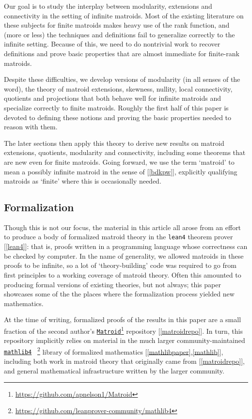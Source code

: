 \documentclass{amsart}
\theoremstyle{plain}
\theoremstyle{definition}
\newcommand{\smalltt}[1]{{\small\texttt{#1}}}
\begin{document}
Our goal is to study the interplay between modularity, 
extensions and connectivity in the setting of infinite matroids. 
Most of the existing literature on these subjects for finite matroids 
makes heavy use of the rank function, 
and (more or less) the techniques and definitions fail to generalize correctly to the infinite setting. 
Because of this,  
we need to do nontrivial work to recover definitions and prove basic 
properties that are almost immediate for finite-rank matroids. 

Despite these difficulties, we develop versions of modularity (in all senses of the word), 
the theory of matroid extensions, skewness, nullity, local connectivity,
quotients and projections 
that both behave well for infinite matroids and specialize correctly to finite matroids. 
Roughly the first half of this paper is devoted to defining these notions
and proving the basic properties needed to reason with them.

The later sections then apply this theory to derive new results on matroid extensions, 
quotients, modularity and connectivity, including some theorems 
that are new even for finite matroids. 
Going forward, we use the term `matroid' to mean a possibly infinite matroid 
in the sense of [\ref{bdkpw}], explicitly qualifying matroids as `finite' where 
this is occasionally needed. 

\subsection*{Formalization}

Though this is not our focus, 
the material in this article all arose from an effort to produce 
a body of formalized matroid theory in the \smalltt{lean4} theorem prover [\ref{lean4}]: 
that is, proofs written in a programming language whose correctness can be checked 
by computer.
In the name of generality, we allowed matroids in these proofs to be infinite,
so a lot of `theory-building' code was required to go from first principles
to a working coverage of matroid theory.  
Often this amounted to producing formal versions of existing theories, 
but not always; this paper showcases some of the the places where the formalization
process yielded new mathematics.

At the time of writing, formalized proofs of the results in this paper 
are a small fraction of the second author's \href{https://github.com/leanprover-community/mathlib4}{\smalltt{Matroid}}\footnote{\url{https://github.com/apnelson1/Matroid}} repository [\ref{matroidrepo}].
In turn, this repository implicitly relies on material
in the much larger community-maintained \href{https://github.com/leanprover-community/mathlib4}{\smalltt {mathlib4}} 
~\footnote{\url{https://github.com/leanprover-community/mathlib4}} 
library of formalized mathematics [\ref{mathlibpaper},\ref{mathlib}], 
including both work in matroid theory that originally came from [\ref{matroidrepo}], 
and general mathematical infrastructure written by the larger community. 
\end{document}
